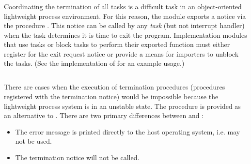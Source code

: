 \subsubsection{}

Coordinating the termination of all tasks is a difficult task in an
object-oriented lightweight process environment.  For this reason,
the module  exports a notice via the procedure
.  This notice can be called by any {\em task}
(but not interrupt handler) when the task determines it is time to exit
the program.  Implementation modules that use tasks or block tasks
to perform their exported function must either register for the exit
request notice or provide a means for importers to unblock the tasks.
(See the implementation of  for an example usage.)

    
\subsection{}

There are cases when the execution of termination procedures 
(procedures registered with the termination notice) would be
impossible because the lightweight process system is in an
unstable state.  The procedure  is provided as an
alternative to .  There are
two primary differences between  and :
\begin{itemize}
\item
    The error message is printed directly to the host operating
    system, i.e.  may not be used.
\item
    The termination notice will not be called.
\end{itemize}


